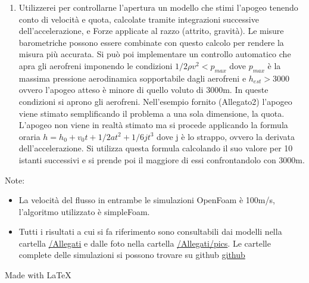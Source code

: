 \documentclass[11pt, a4paper]{article}
\begin{document}
\begin{enumerate}
\item  Utilizzerei per controllarne l'apertura un modello che stimi l'apogeo tenendo conto di velocità e quota, calcolate tramite integrazioni successive dell'accelerazione, e Forze applicate al razzo (attrito, gravità). Le misure barometriche possono essere combinate con questo calcolo per rendere la misura più accurata. Si può poi implementare un controllo automatico che apra gli aerofreni imponendo le condizioni \newline \begin{math} 1/2\rho v^2 < p_{max}\end{math} \newline dove \begin{math}p_{max}  \end{math} è la massima pressione aerodinamica sopportabile dagli aerofreni e \newline\begin{math} h_{est} > 3000\end{math} \newline ovvero l'apogeo atteso è minore di quello voluto di 3000m. In queste condizioni si aprono gli aerofreni. Nell'esempio fornito (Allegato2) l'apogeo viene stimato semplificando il problema a una sola dimensione, la quota. L'apogeo non viene in realtà stimato ma si procede applicando la formula oraria \begin{math}h=h_0 + v_0t + 1/2at^2+ 1/6jt^3 \end{math} dove j è lo strappo, ovvero la derivata dell'accelerazione. Si utilizza questa formula calcolando il suo valore per 10 istanti successivi e si prende poi il maggiore di essi confrontandolo con 3000m. 



\end{enumerate}
Note:
\begin{itemize}
	
	\item La velocità del flusso in entrambe le simulazioni OpenFoam è 100m/s, l'algoritmo utilizzato è simpleFoam.
	\item Tutti i risultati a cui si fa riferimento sono consultabili dai modelli nella cartella \color{blue}\href{file:./Allegati/.}{/Allegati} \color{black} e dalle foto nella cartella \color{blue}\href{file:./Allegati/pics/.}{/Allegati/pics}. \color{black}Le cartelle complete delle simulazioni si possono trovare su github \color{blue}\href{https://github.com/andrea-st1701/CFD_rocket}{github} \color{black}
\end{itemize}
Made with \LaTeX
\end{document}
